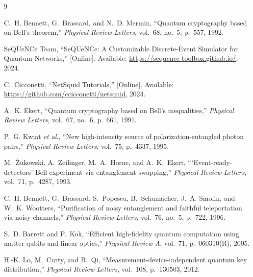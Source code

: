 \documentclass[12pt,oneside,letterpaper,english]{article}
\begin{document}
\newpage
{}
\begin{thebibliography}{9}

C.~H. Bennett, G.~Brassard, and N.~D. Mermin,
``Quantum cryptography based on Bell's theorem,''
\textit{Physical Review Letters}, vol.~68, no.~5, p.~557, 1992.

SeQUeNCe Team,
``SeQUeNCe: A Customizable Discrete-Event Simulator for Quantum Networks,''
[Online]. Available: \url{https://sequence-toolbox.github.io/}, 2024.

C.~Cicconetti,
``NetSquid Tutorials,''
[Online]. Available: \url{https://github.com/ccicconetti/netsquid}, 2024.

A.~K. Ekert,
``Quantum cryptography based on Bell's inequalities,''
\textit{Physical Review Letters}, vol.~67, no.~6, p.~661, 1991.

P.~G. Kwiat \textit{et al.},
``New high-intensity source of polarization-entangled photon pairs,''
\textit{Physical Review Letters}, vol.~75, p.~4337, 1995.

M.~\.Zukowski, A.~Zeilinger, M.~A.~Horne, and A.~K.~Ekert,
```Event-ready-detectors' Bell experiment via entanglement swapping,''
\textit{Physical Review Letters}, vol.~71, p.~4287, 1993.

C.~H. Bennett, G.~Brassard, S.~Popescu, B.~Schumacher, J.~A. Smolin, and W.~K. Wootters,
``Purification of noisy entanglement and faithful teleportation via noisy channels,''
\textit{Physical Review Letters}, vol.~76, no.~5, p.~722, 1996.

S.~D. Barrett and P.~Kok,
``Efficient high-fidelity quantum computation using matter qubits and linear optics,''
\textit{Physical Review A}, vol.~71, p.~060310(R), 2005.

H.-K. Lo, M.~Curty, and B.~Qi,
``Measurement-device-independent quantum key distribution,''
\textit{Physical Review Letters}, vol.~108, p.~130503, 2012.

\end{thebibliography}
\end{document}
